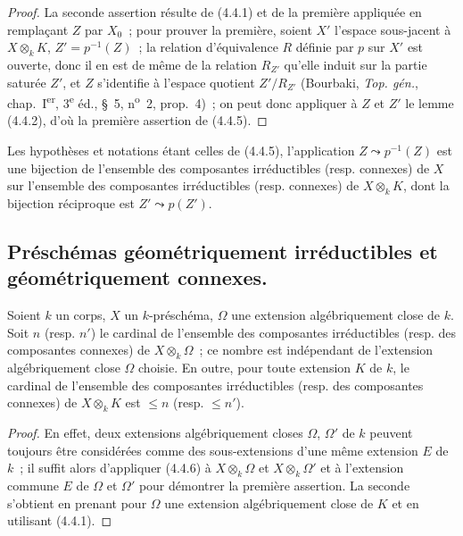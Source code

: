 \begin{proof}
La seconde assertion résulte de (4.4.1) et de la première appliquée en
remplaçant $Z$ par $X_0$~; pour prouver la première, soient $X'$ l'espace
sous-jacent à $X\otimes_k K$, $Z'=p^{-1}(Z)$~; la
relation d'équivalence $R$ définie par $p$ sur $X'$ est ouverte, donc il en est
de même de la relation $R_{Z'}$ qu'elle induit sur la partie saturée $Z'$, et
$Z$ s'identifie à l'espace quotient $Z'/R_{Z'}$ (Bourbaki,
\emph{Top. gén.}, chap.~I\textsuperscript{er}, 3\textsuperscript{e} éd.,
\S~5, n\textsuperscript{o}~2, prop.~4)~; on peut donc appliquer à $Z$ et $Z'$
le lemme (4.4.2), d'où la première assertion de (4.4.5).
\end{proof}

\begin{corollary}[4.4.6]
\label{IV.2.4.4.6-fr}
Les hypothèses et notations étant celles de \textup{(4.4.5)}, l'application
$Z\leadsto p^{-1}(Z)$ est une bijection de l'ensemble des composantes
irréductibles \textup{(resp.} connexes\textup{)} de $X$ sur l'ensemble des composantes
irréductibles \textup{(resp.} connexes\textup{)} de $X\otimes_k K$, dont la bijection réciproque
est $Z'\leadsto p(Z')$.
\end{corollary}

\subsection{Préschémas géométriquement irréductibles et géométriquement
connexes.}
\label{subsection:IV.2.4.5-fr}

\begin{proposition}[4.5.1]
\label{IV.2.4.5.1-fr}
Soient $k$ un corps, $X$ un $k$-préschéma, $\Omega$ une extension
algébriquement close de $k$. Soit $n$ \textup{(resp.} $n'$\textup{)} le cardinal de l'ensemble
des composantes irréductibles \textup{(resp.} des composantes connexes\textup{)} de
$X\otimes_k\Omega$~; ce nombre est indépendant de l'extension algébriquement
close $\Omega$ choisie. En outre, pour toute extension $K$ de $k$, le cardinal
de l'ensemble des composantes irréductibles \textup{(resp.} des composantes connexes\textup{)}
de $X\otimes_k K$ est $\leqslant n$ \textup{(resp.} $\leqslant n'$\textup{)}.
\end{proposition}

\begin{proof}
En effet, deux extensions algébriquement closes $\Omega$, $\Omega'$ de $k$
peuvent toujours être considérées comme des sous-extensions d'une même
extension $E$ de $k$~; il suffit alors d'appliquer (4.4.6) à
$X\otimes_k\Omega$ et $X\otimes_k\Omega'$ et à l'extension commune $E$ de
$\Omega$ et $\Omega'$ pour démontrer la première assertion. La seconde
s'obtient en prenant pour $\Omega$ une extension algébriquement close de $K$
et en utilisant (4.4.1).
\end{proof}

